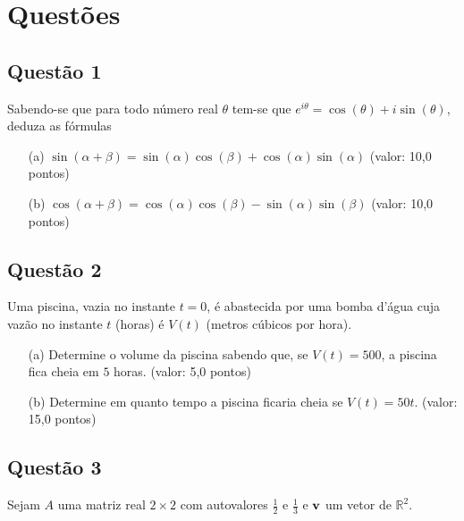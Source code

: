 \documentclass{report}
\begin{document}
\section{\color{blue} Quest\~oes}

\subsection{\color{blue} Quest\~ao 1}

Sabendo-se que para todo n\'umero real $\theta$ tem-se que $e^{i\theta}= \cos (\theta) + i \sin (\theta)$, deduza as f\'ormulas

\begin{enumerate}

\item[(a)] $\sin (\alpha + \beta) = \sin (\alpha) \cos (\beta) + \cos (\alpha) \sin (\alpha)$ (valor: 10,0 pontos)

\item[(b)] $\cos (\alpha + \beta) = \cos (\alpha) \cos (\beta) - \sin (\alpha) \sin (\beta)$ (valor: 10,0 pontos)

\end{enumerate}

\subsection{\color{blue} Quest\~ao 2}

Uma piscina, vazia no instante $t = 0$, \'e abastecida por uma bomba d’\'agua cuja vaz\~ao no instante $t$ (horas) \'e $V(t)$ (metros c\'ubicos por hora).

\begin{enumerate}

\item[(a)] Determine o volume da piscina sabendo que, se $V(t) = 500$, a piscina fica cheia em $5$ horas. (valor: 5,0 pontos)

\item[(b)] Determine em quanto tempo a piscina ficaria cheia se $V(t) = 50 t$. (valor: 15,0 pontos)

\end{enumerate}

\subsection{\color{blue} Quest\~ao 3}

Sejam $A$ uma matriz real $2 \times 2$ com autovalores $\frac1{2}$ e $\frac1{3}$ e $\textbf v$ um vetor de $\mathbb R^2$.
\end{document}
